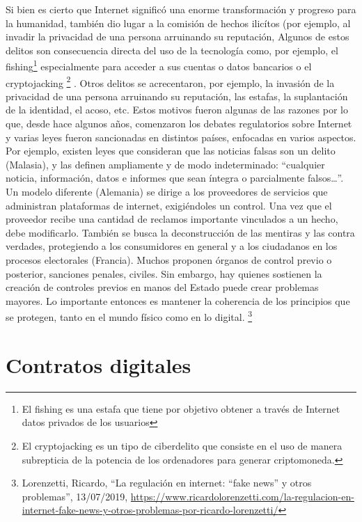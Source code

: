 \documentclass[12pt]{report} %
\begin{document}
Si bien es cierto que Internet significó una enorme transformación y progreso para la humanidad, también dio lugar a la comisión de hechos ilicítos (por ejemplo, al invadir la privacidad de una persona arruinando su reputación, Algunos de estos delitos son consecuencia directa del uso de la tecnología como, 
por ejemplo, el fishing\footnote{El fishing es una estafa que tiene por objetivo obtener a través de Internet datos privados de los usuarios}
especialmente para acceder a sus cuentas o datos bancarios
o el cryptojacking \footnote{El cryptojacking es un tipo de ciberdelito que consiste en el uso de manera subrepticia de la potencia de los ordenadores para generar criptomoneda.} . Otros delitos se acrecentaron, por ejemplo, la invasión de la privacidad de una persona arruinando su reputación, las estafas, la suplantación de la identidad, el acoso, etc.  Estos motivos fueron algunas de las razones por lo que, desde hace algunos años, comenzaron los debates regulatorios sobre Internet y varias leyes fueron sancionadas en distintos países, enfocadas en varios aspectos. Por ejemplo, existen leyes que consideran que las noticias falsas son un delito (Malasia), y las definen ampliamente y de modo indeterminado: “cualquier noticia, información, datos e informes que sean íntegra o parcialmente falsos…”. Un modelo diferente (Alemania) se dirige a los proveedores de servicios que administran plataformas de internet, exigiéndoles un control. Una vez que el proveedor recibe una cantidad de reclamos importante vinculados a un hecho, debe modificarlo. También se busca la deconstrucción de las mentiras y las contra verdades, protegiendo a los consumidores en general y a los ciudadanos en los procesos electorales (Francia). Muchos proponen órganos de control previo o posterior, sanciones penales, civiles. Sin embargo, hay quienes sostienen la creación de controles previos en manos del Estado puede crear problemas mayores. Lo importante entonces es mantener la coherencia de los principios que se protegen, tanto en el mundo físico como en lo digital. \footnote{Lorenzetti, Ricardo, “La regulación en internet: “fake news” y otros problemas”, 13/07/2019, \url{https://www.ricardolorenzetti.com/la-regulacion-en-internet-fake-news-y-otros-problemas-por-ricardo-lorenzetti/}}

           


\chapter{Contratos digitales }
\label{Contratos digitales}
\end{document}
